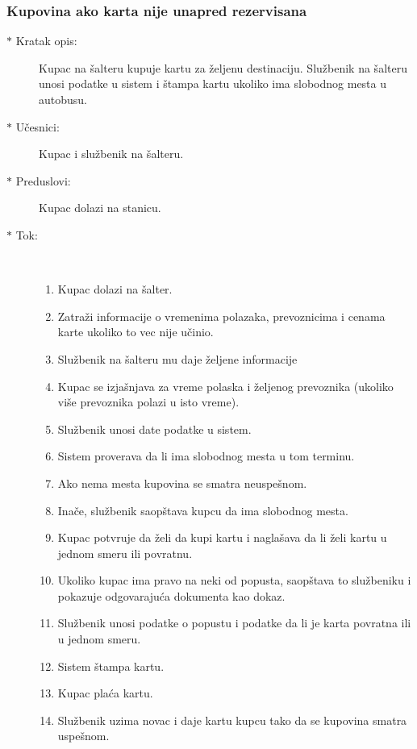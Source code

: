 \subsubsection{Kupovina ako karta nije unapred rezervisana}
\begin{description}
	\item[$\ast$ Kratak opis: ] Kupac na \v salteru kupuje kartu za \v zeljenu destinaciju. Slu\v zbenik na \v salteru unosi podatke u sistem i \v stampa kartu ukoliko ima slobodnog mesta u autobusu.
	\item[$\ast$ U\v cesnici: ] Kupac i slu\v zbenik na \v salteru.
	\item[$\ast$ Preduslovi: ] Kupac dolazi na stanicu.
	\item[$\ast$ Tok: ] \ \\
	\begin{enumerate}
		\item Kupac dolazi na \v salter.
		\item Zatra\v zi informacije o vremenima polazaka, prevoznicima i cenama karte ukoliko to vec nije u\v cinio.
		\item Slu\v zbenik na \v salteru mu daje \v zeljene informacije
		\item Kupac se izja\v snjava za vreme polaska i \v zeljenog prevoznika (ukoliko vi\v se prevoznika polazi u isto vreme).
		\item Slu\v zbenik unosi date podatke u sistem.
		\item Sistem proverava da li ima slobodnog mesta u tom terminu.
		\item Ako nema mesta kupovina se smatra neuspe\v snom.
		\item Ina\v ce, slu\v zbenik saop\v stava kupcu da ima slobodnog mesta.
		\item Kupac potvr\dj{}uje da \v zeli da kupi kartu i nagla\v sava da li \v zeli kartu u jednom smeru ili povratnu.
		\item Ukoliko kupac ima pravo na neki od popusta, saop\v stava to slu\v zbeniku i pokazuje odgovaraju\'ca dokumenta kao dokaz.
		\item Slu\v zbenik unosi podatke o popustu i podatke da li je karta povratna ili u jednom smeru.
		\item Sistem \v stampa kartu.
		\item Kupac pla\' ca kartu.
		\item Slu\v zbenik uzima novac i daje kartu kupcu tako da se kupovina smatra uspe\v snom.
	\end{enumerate}
\end{description}
\clearpage

